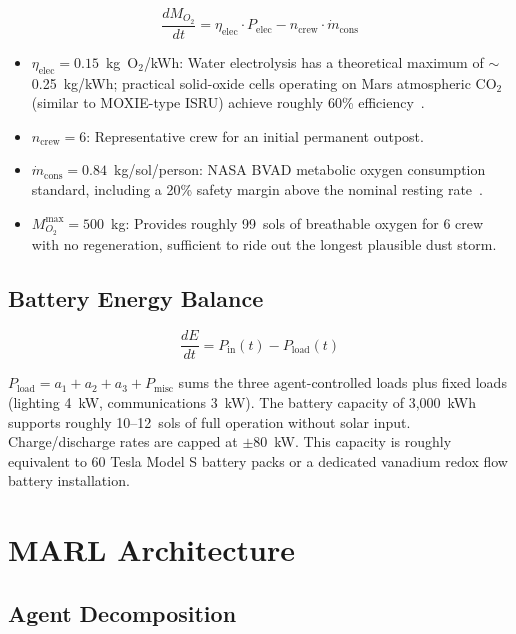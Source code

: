 \documentclass[11pt,a4paper]{article}
\begin{document}
\begin{equation}\label{eq:o2}
  \frac{dM_{O_2}}{dt} = \eta_{\text{elec}} \cdot P_{\text{elec}} - n_{\text{crew}} \cdot \dot{m}_{\text{cons}}
\end{equation}

\begin{itemize}
  \item $\eta_{\text{elec}} = 0.15$~kg~O$_2$/kWh: Water electrolysis has a theoretical maximum of $\sim$0.25~kg/kWh; practical solid-oxide cells operating on Mars atmospheric CO$_2$ (similar to MOXIE-type ISRU) achieve roughly 60\% efficiency~\cite{mars_isru}.
  \item $n_{\text{crew}} = 6$: Representative crew for an initial permanent outpost.
  \item $\dot{m}_{\text{cons}} = 0.84$~kg/sol/person: NASA BVAD metabolic oxygen consumption standard, including a 20\% safety margin above the nominal resting rate~\cite{nasa_ls}.
  \item $M_{O_2}^{\text{max}} = 500$~kg: Provides roughly 99~sols of breathable oxygen for 6 crew with no regeneration, sufficient to ride out the longest plausible dust storm.
\end{itemize}

\subsection{Battery Energy Balance}

\begin{equation}\label{eq:battery}
  \frac{dE}{dt} = P_{\text{in}}(t) - P_{\text{load}}(t)
\end{equation}

$P_{\text{load}} = a_1 + a_2 + a_3 + P_{\text{misc}}$ sums the three agent-controlled loads plus fixed loads (lighting 4~kW, communications 3~kW). The battery capacity of 3,000~kWh supports roughly 10--12~sols of full operation without solar input. Charge/discharge rates are capped at $\pm 80$~kW. This capacity is roughly equivalent to 60 Tesla Model S battery packs or a dedicated vanadium redox flow battery installation.

\section{MARL Architecture}

\subsection{Agent Decomposition}
\end{document}
